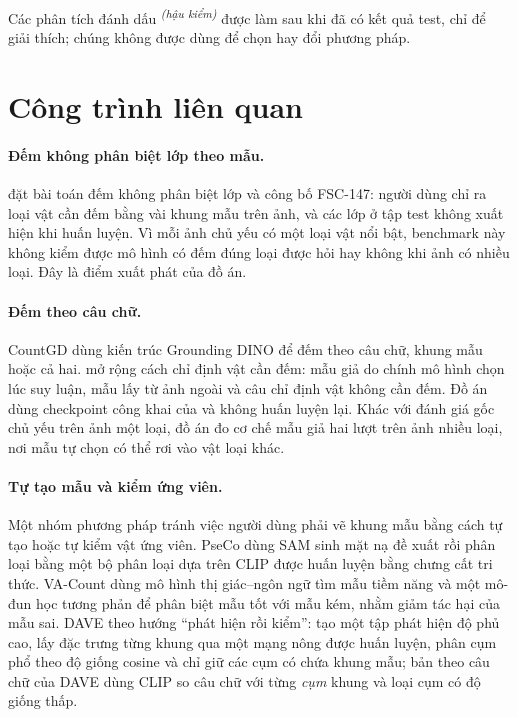 \documentclass[12pt,a4paper]{article}
\newcommand{\hk}{\textsuperscript{\textit{(hậu kiểm)}}}
\begin{document}
Các phân tích đánh dấu \hk{} được làm sau khi đã có kết quả test, chỉ để giải thích; chúng không được dùng để chọn hay đổi phương pháp.

\section{Công trình liên quan}\label{sec:related}

\paragraph{Đếm không phân biệt lớp theo mẫu.}
\textcite{ranjan2021fsc147} đặt bài toán đếm không phân biệt lớp và công bố FSC-147: người dùng chỉ ra loại vật cần đếm bằng vài khung mẫu trên ảnh, và các lớp ở tập test không xuất hiện khi huấn luyện. Vì mỗi ảnh chủ yếu có một loại vật nổi bật, benchmark này không kiểm được mô hình có đếm đúng loại được hỏi hay không khi ảnh có nhiều loại. Đây là điểm xuất phát của đồ án.

\paragraph{Đếm theo câu chữ.}
CountGD \parencite{aminiNaieni2024countgd} dùng kiến trúc Grounding DINO \parencite{liu2024groundingdino} để đếm theo câu chữ, khung mẫu hoặc cả hai. \cgdpp{} \parencite{aminiNaieni2025countgdpp} mở rộng cách chỉ định vật cần đếm: mẫu giả do chính mô hình chọn lúc suy luận, mẫu lấy từ ảnh ngoài và câu chỉ định vật không cần đếm. Đồ án dùng checkpoint công khai của \cgdpp{} và không huấn luyện lại. Khác với đánh giá gốc chủ yếu trên ảnh một loại, đồ án đo cơ chế mẫu giả hai lượt trên ảnh nhiều loại, nơi mẫu tự chọn có thể rơi vào vật loại khác.

\paragraph{Tự tạo mẫu và kiểm ứng viên.}
Một nhóm phương pháp tránh việc người dùng phải vẽ khung mẫu bằng cách tự tạo hoặc tự kiểm vật ứng viên. PseCo \parencite{huang2024pseco} dùng SAM sinh mặt nạ đề xuất rồi phân loại bằng một bộ phân loại dựa trên CLIP được huấn luyện bằng chưng cất tri thức. VA-Count \parencite{zhu2024vacount} dùng mô hình thị giác--ngôn ngữ tìm mẫu tiềm năng và một mô-đun học tương phản để phân biệt mẫu tốt với mẫu kém, nhằm giảm tác hại của mẫu sai. DAVE \parencite{pelhan2024dave} theo hướng ``phát hiện rồi kiểm'': tạo một tập phát hiện độ phủ cao, lấy đặc trưng từng khung qua một mạng nông được huấn luyện, phân cụm phổ theo độ giống cosine và chỉ giữ các cụm có chứa khung mẫu; bản theo câu chữ của DAVE dùng CLIP so câu chữ với từng \emph{cụm} khung và loại cụm có độ giống thấp.
\end{document}
